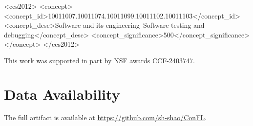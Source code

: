 \documentclass[acmsmall]{acmart}
\begin{document}
\begin{CCSXML}
<ccs2012>
   <concept>
       <concept_id>10011007.10011074.10011099.10011102.10011103</concept_id>
       <concept_desc>Software and its engineering~Software testing and debugging</concept_desc>
       <concept_significance>500</concept_significance>
       </concept>
 </ccs2012>
\end{CCSXML}




\maketitle








\begin{acks}
This work was supported in part by NSF awards CCF-2403747. 
\end{acks}

\section*{Data Availability}
The full artifact is available at \url{https://github.com/sh-shao/ConFL}.







\end{document}
